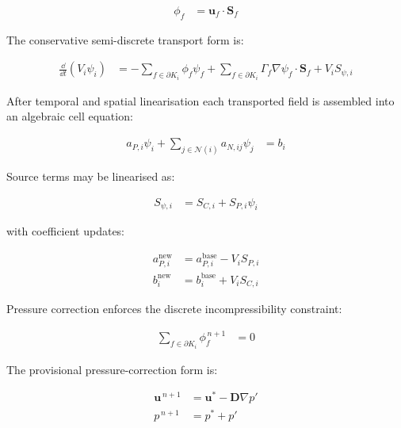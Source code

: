 \begin{align}
  \phi_f
  &=
  \mathbf{u}_f
  \cdot
  \mathbf{S}_f
  \label{eq:res-num-frm-local-face-volume-flux}
\end{align}

The conservative semi-discrete transport form is:

\begin{align}
  \frac{\dd}{\dd t}
  \left(
    V_i\psi_i
  \right)
  &=
  -
  \sum_{f\in\partial K_i}
  \phi_f\psi_f
  +
  \sum_{f\in\partial K_i}
  \Gamma_f
  \nabla\psi_f
  \cdot
  \mathbf{S}_f
  +
  V_i S_{\psi,i}
  \label{eq:res-num-frm-local-conservative-transport}
\end{align}

After temporal and spatial linearisation each transported field is
assembled into an algebraic cell equation:

\begin{align}
  a_{P,i}\psi_i
  +
  \sum_{j\in\mathcal{N}(i)}
  a_{N,ij}\psi_j
  &=
  b_i
  \label{eq:res-num-frm-local-algebraic-cell-equation}
\end{align}

Source terms may be linearised as:

\begin{align}
  S_{\psi,i}
  &=
  S_{C,i}
  +
  S_{P,i}\psi_i
  \label{eq:res-num-frm-local-source-linearisation}
\end{align}

with coefficient updates:

\begin{align}
  a_{P,i}^{\mathrm{new}}
  &=
  a_{P,i}^{\mathrm{base}}
  -
  V_i S_{P,i}
  \label{eq:res-num-frm-local-source-ap-update}
  \\
  b_i^{\mathrm{new}}
  &=
  b_i^{\mathrm{base}}
  +
  V_i S_{C,i}
  \label{eq:res-num-frm-local-source-b-update}
\end{align}

Pressure correction enforces the discrete incompressibility constraint:

\begin{align}
  \sum_{f\in\partial K_i}
  \phi_f^{\,n+1}
  &=
  0
  \label{eq:res-num-frm-local-discrete-continuity}
\end{align}

The provisional pressure-correction form is:

\begin{align}
  \mathbf{u}^{\,n+1}
  &=
  \mathbf{u}^{*}
  -
  \mathbf{D}
  \nabla p'
  \label{eq:res-num-frm-local-velocity-correction}
  \\
  p^{\,n+1}
  &=
  p^{*}
  +
  p'
  \label{eq:res-num-frm-local-pressure-correction}
\end{align}


